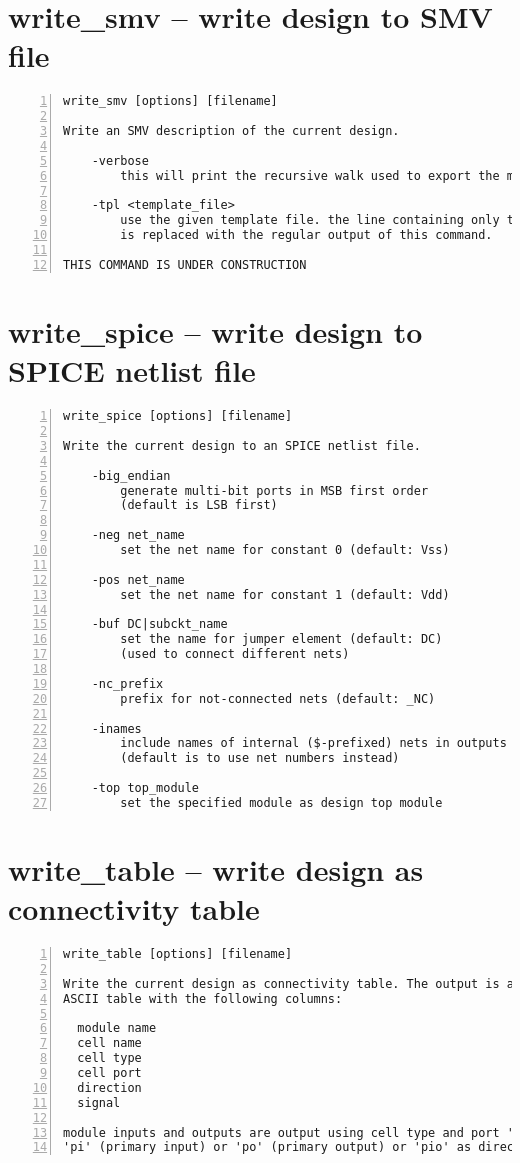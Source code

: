 \section{write\_smv -- write design to SMV file}
\label{cmd:write_smv}
\begin{lstlisting}[numbers=left,frame=single]
    write_smv [options] [filename]

Write an SMV description of the current design.

    -verbose
        this will print the recursive walk used to export the modules.

    -tpl <template_file>
        use the given template file. the line containing only the token '%%'
        is replaced with the regular output of this command.

THIS COMMAND IS UNDER CONSTRUCTION
\end{lstlisting}

\section{write\_spice -- write design to SPICE netlist file}
\label{cmd:write_spice}
\begin{lstlisting}[numbers=left,frame=single]
    write_spice [options] [filename]

Write the current design to an SPICE netlist file.

    -big_endian
        generate multi-bit ports in MSB first order
        (default is LSB first)

    -neg net_name
        set the net name for constant 0 (default: Vss)

    -pos net_name
        set the net name for constant 1 (default: Vdd)

    -buf DC|subckt_name
        set the name for jumper element (default: DC)
        (used to connect different nets)

    -nc_prefix
        prefix for not-connected nets (default: _NC)

    -inames
        include names of internal ($-prefixed) nets in outputs
        (default is to use net numbers instead)

    -top top_module
        set the specified module as design top module
\end{lstlisting}

\section{write\_table -- write design as connectivity table}
\label{cmd:write_table}
\begin{lstlisting}[numbers=left,frame=single]
    write_table [options] [filename]

Write the current design as connectivity table. The output is a tab-separated
ASCII table with the following columns:

  module name
  cell name
  cell type
  cell port
  direction
  signal

module inputs and outputs are output using cell type and port '-' and with
'pi' (primary input) or 'po' (primary output) or 'pio' as direction.
\end{lstlisting}

